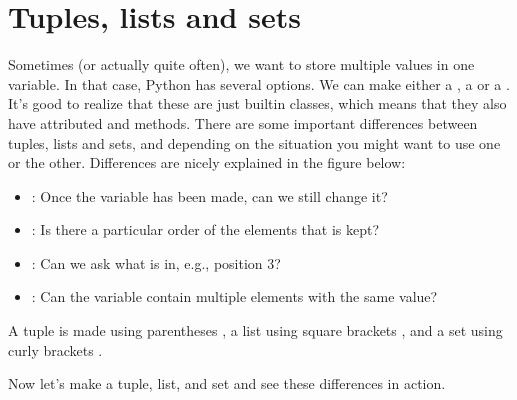 \documentclass[letterpaper,10pt,english]{jupyterBook}
\begin{document}
\section{Tuples, lists and sets}
\label{\detokenize{notebooks/Tutorial1_NumpySimpleITK/Tutorial1_NumpySimpleITK_student:tuples-lists-and-sets}}
\sphinxAtStartPar
Sometimes (or actually quite often), we want to store multiple values in one variable. In that case, Python has several options. We can make either a , a  or a . It’s good to realize that these are just built\sphinxhyphen{}in classes, which means that they also have attributed and methods. There are some important differences between tuples, lists and sets, and depending on the situation you might want to use one or the other. Differences are nicely explained in the figure below:
\begin{itemize}
\item {} 
\sphinxAtStartPar
{}: Once the variable has been made, can we still change it?

\item {} 
\sphinxAtStartPar
{}: Is there a particular order of the elements that is kept?

\item {} 
\sphinxAtStartPar
{}: Can we ask what is in, e.g., position 3?

\item {} 
\sphinxAtStartPar
{}: Can the variable contain multiple elements with the same value?

\end{itemize}

\sphinxAtStartPar


\sphinxAtStartPar
A tuple is made using parentheses , a list using square brackets , and a set using curly brackets .

\sphinxAtStartPar
Now let’s make a tuple, list, and set and see these differences in action.
\end{document}
